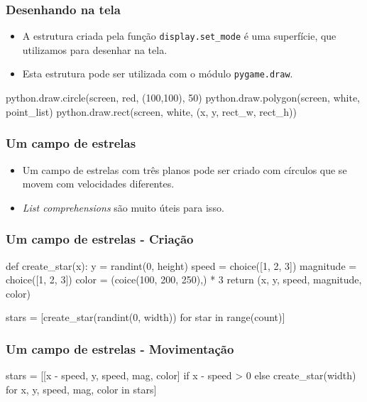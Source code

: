 \begin{frame}[fragile]
    \frametitle{Desenhando na tela}
    \begin{itemize}
        \item A estrutura criada pela função \texttt{display.set\_mode} é uma
        superfície, que utilizamos para desenhar na tela.
        \item Esta estrutura pode ser utilizada com o módulo \texttt{pygame.draw}.
    \end{itemize}
    \hfill
    \begin{python}
        python.draw.circle(screen, red, (100,100), 50)
        python.draw.polygon(screen, white, point_list)
        python.draw.rect(screen, white, (x, y, rect_w, rect_h))
    \end{python}
\end{frame}

\begin{frame}
    \frametitle{Um campo de estrelas}

    \begin{itemize}
        \item Um campo de estrelas com três planos pode ser criado com círculos
        que se movem com velocidades diferentes.
        \item \textit{List comprehensions} são muito úteis para isso.
    \end{itemize}
\end{frame}

\begin{frame}[fragile]
    \frametitle{Um campo de estrelas - Criação}

    \begin{python}
    def create_star(x):
        y = randint(0, height)
        speed = choice([1, 2, 3])
        magnitude = choice([1, 2, 3])
        color = (coice(100, 200, 250),) * 3
        return (x, y, speed, magnitude, color)

    stars = [create_star(randint(0, width)) for star in range(count)]
    \end{python}
\end{frame}

\begin{frame}[fragile]
    \frametitle{Um campo de estrelas - Movimentação}

    \begin{python}
    stars = [[x - speed, y, speed, mag, color]
             if x - speed > 0
             else create_star(width)
             for x, y, speed, mag, color in stars]
    \end{python}
\end{frame}


